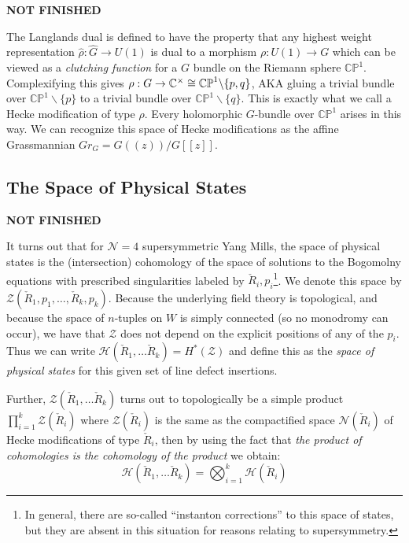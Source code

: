 	\textbf{NOT FINISHED}
	
	The Langlands dual is defined to have the property that any highest weight representation $\hat \rho: \hat G \to U(1)$ is dual to a morphism $\rho: U(1) \to G$ which can be viewed as a \emph{clutching function} for a $G$ bundle on the Riemann sphere $\mathbb{CP}^1$. Complexifying this gives $\rho: G \to \mathbb{C}^\times \cong \mathbb{CP}^1 \backslash \{p, q \}$, AKA gluing a trivial bundle over $\mathbb{CP}^1 \backslash \{p \}$ to a trivial bundle over $\mathbb{CP}^1 \backslash \{q \}$. This is exactly what we call a Hecke modification of type $\rho$. Every holomorphic $G$-bundle over $\mathbb{CP}^1$ arises in this way. We can recognize this space of Hecke modifications as the affine Grassmannian $Gr_G = G((z))/G[[z]]$.

	\subsection{The Space of Physical States}
	
	\textbf{NOT FINISHED}
	
	It turns out that for $\mathcal N = 4$ supersymmetric Yang Mills, the space of physical states is the (intersection) cohomology of the space of solutions to the Bogomolny equations with prescribed singularities labeled by $\check R_i, p_i$\footnote{In general, there are so-called ``instanton corrections'' to this space of states, but they are absent in this situation for reasons relating to supersymmetry.}. We denote this space by $\mathcal Z(\check R_1, p_1, \dots, \check R_k, p_k)$. Because the underlying field theory is topological, and because the space of $n$-tuples on $W$ is simply connected (so no monodromy can occur), we have that $\mathcal Z$ does not depend on the explicit positions of any of the $p_i$. Thus we can write $\mathcal H (\check R_1, \dots \check R_k) = H^*(\mathcal Z)$ and define this as the \emph{space of physical states} for this given set of line defect insertions.
	
	Further, $\mathcal Z(\check R_1, \dots \check R_k)$ turns out to topologically be a simple product $\prod_{i=1}^k \mathcal Z(\check R_i)$ where $\mathcal Z(\check R_i)$ is the same as the compactified space $\mathcal N(\check R_i)$ of Hecke modifications of type $\check R_i$, then by using the fact that \emph{the product of cohomologies is the cohomology of the product} we obtain:
	\begin{equation}
		\mathcal H(\check R_1, \dots \check R_k) = \bigotimes_{i=1}^k \mathcal H(\check R_i)
	\end{equation}
	
